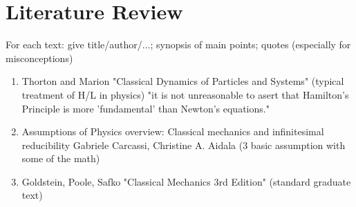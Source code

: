 \documentclass{article}
\begin{document}
\section{Literature Review}
For each text: give title/author/...; synopsis of main points; quotes (especially for misconceptions)

\begin{enumerate}
\item Thorton and Marion "Classical Dynamics of Particles and Systems"
(typical treatment of H/L in physics)
"it is not unreasonable to asert that Hamilton's Principle is more 'fundamental' than Newton's equations."
\item Assumptions of Physics overview:
Classical mechanics and infinitesimal reducibility
Gabriele Carcassi, Christine A. Aidala (3 basic assumption with some of the math)
\item Goldstein, Poole, Safko "Classical Mechanics 3rd Edition"
(standard graduate text)

\end{enumerate}
\end{document}
